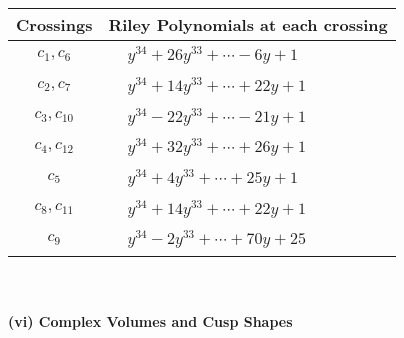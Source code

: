 \documentclass[1p]{elsarticle_modified}
\theoremstyle{definition}
\begin{document}
\begin{tabular}{m{50pt}|m{274pt}}
Crossings & \hspace{64pt}Riley Polynomials at each crossing \\
\hline $$\begin{aligned}c_{1},c_{6}\end{aligned}$$&$\begin{aligned}
&y^{34}+26 y^{33}+\cdots-6 y+1
\end{aligned}$\\
\hline $$\begin{aligned}c_{2},c_{7}\end{aligned}$$&$\begin{aligned}
&y^{34}+14 y^{33}+\cdots+22 y+1
\end{aligned}$\\
\hline $$\begin{aligned}c_{3},c_{10}\end{aligned}$$&$\begin{aligned}
&y^{34}-22 y^{33}+\cdots-21 y+1
\end{aligned}$\\
\hline $$\begin{aligned}c_{4},c_{12}\end{aligned}$$&$\begin{aligned}
&y^{34}+32 y^{33}+\cdots+26 y+1
\end{aligned}$\\
\hline $$\begin{aligned}c_{5}\end{aligned}$$&$\begin{aligned}
&y^{34}+4 y^{33}+\cdots+25 y+1
\end{aligned}$\\
\hline $$\begin{aligned}c_{8},c_{11}\end{aligned}$$&$\begin{aligned}
&y^{34}+14 y^{33}+\cdots+22 y+1
\end{aligned}$\\
\hline $$\begin{aligned}c_{9}\end{aligned}$$&$\begin{aligned}
&y^{34}-2 y^{33}+\cdots+70 y+25
\end{aligned}$\\
\hline
\end{tabular}\\~\\
\newpage\flushleft \textbf{(vi) Complex Volumes and Cusp Shapes}
\end{document}
